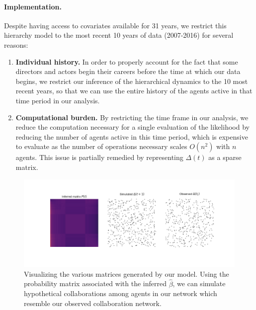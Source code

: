 \documentclass{article}
\begin{document}
\paragraph{Implementation.}

Despite having access to covariates available for 31 years, we restrict this hierarchy model to the most recent 10 years of data (2007-2016) for several reasons:

\begin{enumerate}
    \item \textbf{Individual history.} In order to properly account for the fact that some directors and actors begin their careers before the time at which our data begins, we restrict our inference of the hierarchical dynamics to the 10 most recent years, so that we can use the entire history of the agents active in that time period in our analysis.
    \item \textbf{Computational burden.} By restricting the time frame in our analysis, we reduce the computation necessary for a single evaluation of the likelihood by reducing the number of agents active in this time period, which is expensive to evaluate as the number of operations necessary scales $O(n^2)$ with $n$ agents. This issue is partially remedied by representing $\Delta(t)$ as a sparse matrix. 
\end{enumerate}

\begin{figure}
    \centering
    \includegraphics[scale=0.5]{matrix_plot.png}
    \caption{Visualizing the various matrices generated by our model. Using the probability matrix associated with the inferred $\hat{\beta}$, we can simulate hypothetical collaborations among agents in our network which resemble our observed collaboration network.}
    \label{fig:my_label}
\end{figure}
\end{document}

